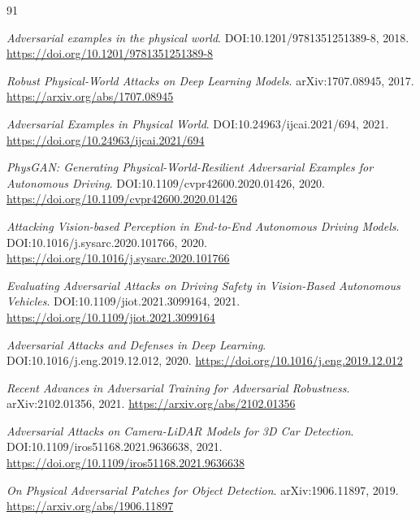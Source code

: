 \documentclass[11pt,a4paper]{article}
\begin{document}
\begin{thebibliography}{91}
\setlength{\itemsep}{2pt}

\newblock \emph{Adversarial examples in the physical world}.
\newblock DOI:10.1201/9781351251389-8, 2018.
\newblock \url{https://doi.org/10.1201/9781351251389-8}

\newblock \emph{Robust Physical-World Attacks on Deep Learning Models}.
\newblock arXiv:1707.08945, 2017.
\newblock \url{https://arxiv.org/abs/1707.08945}

\newblock \emph{Adversarial Examples in Physical World}.
\newblock DOI:10.24963/ijcai.2021/694, 2021.
\newblock \url{https://doi.org/10.24963/ijcai.2021/694}

\newblock \emph{PhysGAN: Generating Physical-World-Resilient Adversarial Examples for Autonomous Driving}.
\newblock DOI:10.1109/cvpr42600.2020.01426, 2020.
\newblock \url{https://doi.org/10.1109/cvpr42600.2020.01426}

\newblock \emph{Attacking Vision-based Perception in End-to-End Autonomous Driving Models}.
\newblock DOI:10.1016/j.sysarc.2020.101766, 2020.
\newblock \url{https://doi.org/10.1016/j.sysarc.2020.101766}

\newblock \emph{Evaluating Adversarial Attacks on Driving Safety in Vision-Based Autonomous Vehicles}.
\newblock DOI:10.1109/jiot.2021.3099164, 2021.
\newblock \url{https://doi.org/10.1109/jiot.2021.3099164}

\newblock \emph{Adversarial Attacks and Defenses in Deep Learning}.
\newblock DOI:10.1016/j.eng.2019.12.012, 2020.
\newblock \url{https://doi.org/10.1016/j.eng.2019.12.012}

\newblock \emph{Recent Advances in Adversarial Training for Adversarial Robustness}.
\newblock arXiv:2102.01356, 2021.
\newblock \url{https://arxiv.org/abs/2102.01356}

\newblock \emph{Adversarial Attacks on Camera-LiDAR Models for 3D Car Detection}.
\newblock DOI:10.1109/iros51168.2021.9636638, 2021.
\newblock \url{https://doi.org/10.1109/iros51168.2021.9636638}

\newblock \emph{On Physical Adversarial Patches for Object Detection}.
\newblock arXiv:1906.11897, 2019.
\newblock \url{https://arxiv.org/abs/1906.11897}


\end{thebibliography}
\end{document}
